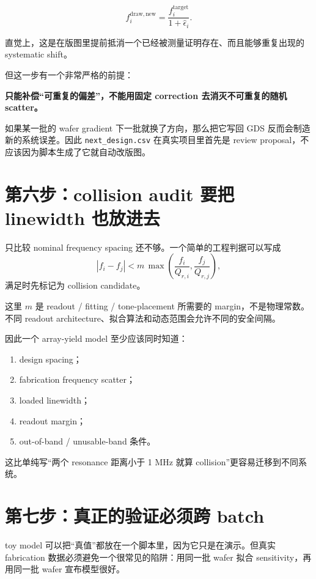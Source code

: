 \[
f_i^{\mathrm{draw,new}}
=
\frac{f_i^{\mathrm{target}}}{1+\hat{\epsilon}_i}.
\]

直觉上，这是在版图里提前抵消一个已经被测量证明存在、而且能够重复出现的 systematic shift。

但这一步有一个非常严格的前提：

\begin{center}
\textbf{只能补偿“可重复的偏差”，不能用固定 correction 去消灭不可重复的随机 scatter。}
\end{center}

如果某一批的 wafer gradient 下一批就换了方向，那么把它写回 GDS 反而会制造新的系统误差。因此 \texttt{next\_design.csv} 在真实项目里首先是 review proposal，不应该因为脚本生成了它就自动改版图。

\section{第六步：collision audit 要把 linewidth 也放进去}

只比较 nominal frequency spacing 还不够。一个简单的工程判据可以写成
\[
|f_i-f_j|
<
m\,
\max\left(
\frac{f_i}{Q_{r,i}},
\frac{f_j}{Q_{r,j}}
\right),
\]
满足时先标记为 collision candidate。

这里 $m$ 是 readout / fitting / tone-placement 所需要的 margin，不是物理常数。不同 readout architecture、拟合算法和动态范围会允许不同的安全间隔。

因此一个 array-yield model 至少应该同时知道：

\begin{enumerate}
  \item design spacing；
  \item fabrication frequency scatter；
  \item loaded linewidth；
  \item readout margin；
  \item out-of-band / unusable-band 条件。
\end{enumerate}

这比单纯写“两个 resonance 距离小于 1 MHz 就算 collision”更容易迁移到不同系统。

\section{第七步：真正的验证必须跨 batch}

toy model 可以把“真值”都放在一个脚本里，因为它只是在演示。但真实 fabrication 数据必须避免一个很常见的陷阱：用同一批 wafer 拟合 sensitivity，再用同一批 wafer 宣布模型很好。

